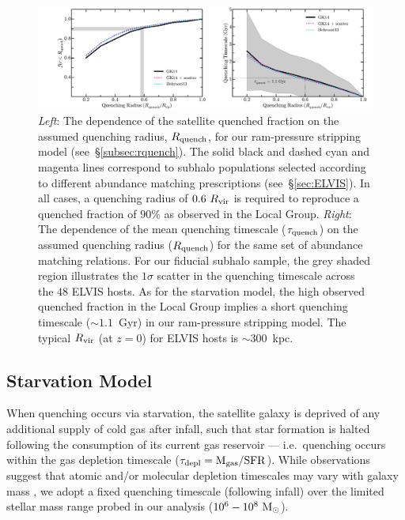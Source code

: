 \begin{figure}
  \centering
  \hspace*{-0.42in}
  \includegraphics[width=6.5in]{tcbflash/f4.pdf}
  \caption[Ram-Pressure Model]{\emph{Left}: The dependence of the satellite quenched
    fraction on the assumed quenching radius, $R_{\rm quench}$, for our
    ram-pressure stripping model (see~\S\ref{subsec:rquench}). The
    solid black and dashed cyan and magenta lines correspond to subhalo
    populations selected according to different abundance matching
    prescriptions (see~\S\ref{sec:ELVIS}). In all cases, a quenching
    radius of $0.6~R_{\rm vir}$ is required to reproduce a quenched
    fraction of $90\%$ as observed in the Local Group. \emph{Right}:
    The dependence of the mean quenching timescale ($\tau_{\rm
      quench}$) on the assumed quenching radius ($R_{\rm quench}$) for
    the same set of abundance matching relations. For our fiducial
    subhalo sample, the grey shaded region illustrates the $1\sigma$
    scatter in the quenching timescale across the $48$ ELVIS hosts. As
    for the starvation model, the high observed quenched fraction in
    the Local Group implies a short quenching timescale ($\sim1.1$~Gyr)
    in our ram-pressure stripping model. The typical $R_{\rm vir}$ (at
    $z=0$) for ELVIS hosts is $\sim300$~kpc.}
  \label{fig:rquench}
\end{figure}



\subsection{Starvation Model}
\label{subsec:tquench}

When quenching occurs via starvation, the satellite galaxy is deprived
of any additional supply of cold gas after infall, such that star
formation is halted following the consumption of its current gas
reservoir --- i.e.~quenching occurs within the gas depletion timescale
($\tau_{\rm depl} = {\rm M}_{\rm gas} / {\rm SFR}$). While
observations suggest that atomic and/or molecular depletion timescales
may vary with galaxy mass \citep{leroy08, bigiel11, boselli14,
  somerville15}, we adopt a fixed quenching timescale (following infall)
over the limited stellar mass range probed in our analysis
($10^{6}-10^{8}~{\rm M}_{\odot}$).



